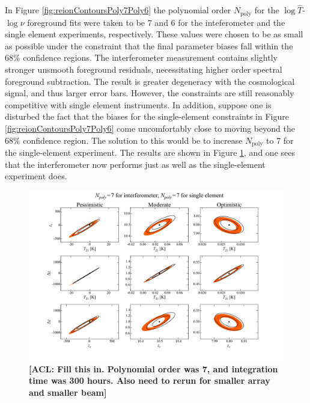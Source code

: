 \documentclass[twolcolumn,apj,iop,numberedappendix]{emulateapj}
\newcommand{\acl}[1]{{\color{red} \textbf{[ACL:  #1]}}}
\begin{document}
In Figure \ref{fig:reionContoursPoly7Poly6} the polynomial order $N_\textrm{poly}$ for the $\log \widehat{T}$-$\log \nu$ foreground fits were taken to be 7 and 6 for the inteferometer and the single element experiments, respectively. These values were chosen to be as small as possible under the constraint that the final parameter biases fall within the $68\%$ confidence regions. The interferometer measurement contains slightly stronger unsmooth foreground residuals, necessitating higher order spectral foreground subtraction. The result is greater degeneracy with the cosmological signal, and thus larger error bars. However, the constraints are still reasonably competitive with single element instruments. In addition, suppose one is disturbed the fact that the biases for the single-element constraints in Figure \ref{fig:reionContoursPoly7Poly6} come uncomfortably close to moving beyond the $68\%$ confidence region. The solution to this would be to increase $N_\textrm{poly}$ to 7 for the single-element experiment. The results are shown in Figure \ref{fig:reionContoursPoly7Poly7}, and one sees that the interferometer now performs just as well as the single-element experiment does.

\begin{figure}[t]
	\centering
	\includegraphics[width=1.00\textwidth,trim=3cm 2cm 3cm 0cm,clip]{figures/reionContoursPoly7Poly7.pdf}
	\caption{\acl{Fill this in. Polynomial order was 7, and integration time was 300 hours. Also need to rerun for smaller array and smaller beam}}
	\label{fig:reionContoursPoly7Poly7}
\end{figure}
\end{document}
